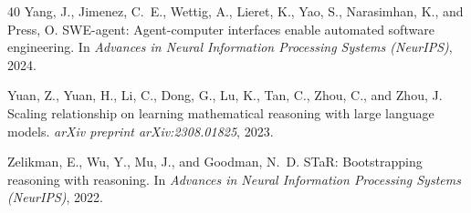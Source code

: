 \begin{thebibliography}{40}
Yang, J., Jimenez, C.~E., Wettig, A., Lieret, K., Yao, S., Narasimhan, K.,
  and Press, O.
\newblock SWE-agent: Agent-computer interfaces enable automated software
  engineering.
\newblock In \textit{Advances in Neural Information Processing Systems
  (NeurIPS)}, 2024.

Yuan, Z., Yuan, H., Li, C., Dong, G., Lu, K., Tan, C., Zhou, C., and Zhou, J.
\newblock Scaling relationship on learning mathematical reasoning with large
  language models.
\newblock \textit{arXiv preprint arXiv:2308.01825}, 2023.

Zelikman, E., Wu, Y., Mu, J., and Goodman, N.~D.
\newblock STaR: Bootstrapping reasoning with reasoning.
\newblock In \textit{Advances in Neural Information Processing Systems
  (NeurIPS)}, 2022.

\end{thebibliography}

